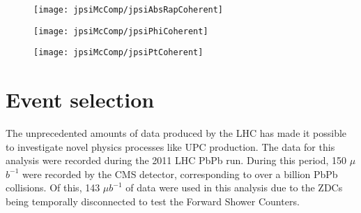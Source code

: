    \DIFaddbegin {} \pt{} \JPsi{} \pt{} \begin{figure}[h]
        \centering
        \texttt{[image: jpsiMcComp/jpsiAbsRapCoherent]}
        \caption{\JPsi{} }
        \label{fig:jpsiAbsRapCoherent}
      \end{figure}
      \begin{figure}[h]
        \centering
        \texttt{[image: jpsiMcComp/jpsiPhiCoherent]}
        \caption{\JPsi{} }
        \label{fig:jpsiPhiCoherent}
      \end{figure}
      \begin{figure}[h]
        \centering
        \texttt{[image: jpsiMcComp/jpsiPtCoherent]}
        \caption{\pt{} \JPsi{} }
        \label{fig:jpsiPtCoherent}
      \end{figure}

  \DIFaddend \section{\label{sec:DataSetEvSel} Event selection}
    The unprecedented amounts of data produced by the LHC has made it possible 
      to investigate novel physics processes like UPC \JPsi{} production.
    The data for this analysis were recorded during the 2011 LHC PbPb run. 
    During this period, 150 $\mu$$b^{-1}$ were recorded by the CMS detector,
      corresponding to over a billion PbPb collisions. 
    Of this, 143 \DIFaddbegin {}\DIFaddend $\mu$$b^{-1}$ of data were used in this analysis due to the 
      ZDCs being temporally disconnected to test the Forward Shower Counters.

